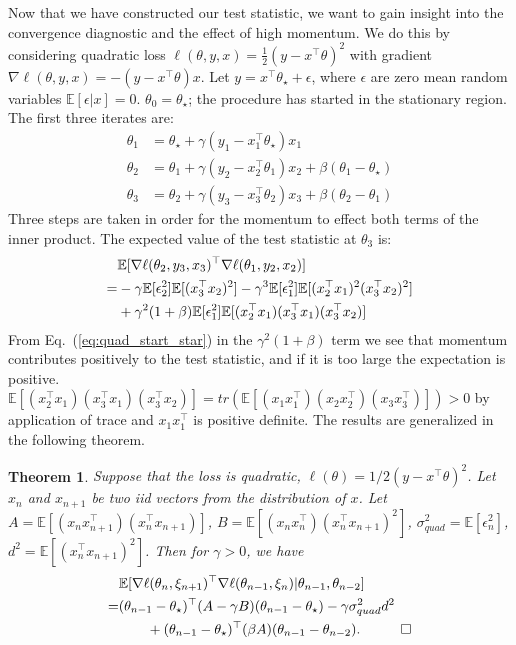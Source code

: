 \documentclass[conference]{IEEEtran}
\newcommand{\Ex}[1]{\mathbb{E}[ #1 ]}
\newtheorem{theorem}{Theorem}
\begin{document}
Now that we have constructed our test statistic, we want to gain insight into the convergence diagnostic and the effect of high momentum.
We do this by considering quadratic loss $\ell ( \theta, y, x ) = \frac{1}{2} ( y - x^\top \theta )^2$ with gradient $\nabla \ell ( \theta, y, x ) = - ( y - x^\top \theta) x$.
Let $y = x^\top \theta_\star + \epsilon$, where $\epsilon$ are zero mean random variables $\Ex{ \epsilon | x } = 0$. $\theta_0 = \theta_\star$; the procedure has started in the stationary region.
The first three iterates are:
\begin{align*}
\theta_1 &= \theta_\star + \gamma ( y_1 - x_1^\top \theta_\star ) x_1 \\
\theta_2 &= \theta_1 + \gamma ( y_2 - x_2^\top \theta_1 ) x_2 + \beta ( \theta_1 - \theta_\star ) \\
\theta_3 &= \theta_2 + \gamma ( y_3 - x_3^\top \theta_2 ) x_3 + \beta ( \theta_2 - \theta_1 )
\end{align*}
Three steps are taken in order for the momentum to effect both terms of the inner product.
The expected value of the test statistic at $\theta_3$ is:
\begin{align}\notag
&\Ex{ \nabla \ell ( \theta_2, y_3, x_3 )^\top \nabla \ell ( \theta_1, y_2, x_2 ) }  \\
=& - \gamma \Ex{ \epsilon_2^2 } \Ex{ ( x_3^\top x_2 )^2 } - \gamma^3 \Ex { \epsilon_1^2 } \Ex { ( x_2^\top x_1 )^2 ( x_3^\top x_2 )^2 } \nonumber \\\label{eq:quad_start_star}
& + \gamma^2 ( 1 + \beta ) \Ex{ \epsilon_1^2 } \Ex{ ( x_2^\top x_1 ) ( x_3^\top x_1 ) ( x_3^\top x_2 ) } 
\end{align}
From Eq.~(\ref{eq:quad_start_star}) in the $\gamma^2 (1+\beta)$ term we see that momentum contributes positively to the test statistic, and if it is too large the expectation is positive.  $\Ex{ ( x_2^\top x_1 ) ( x_3^\top x_1 ) ( x_3^\top x_2 ) } = tr( \Ex{(x_1 x_1^\top) (x_2 x_2^\top) (x_3 x_3^\top) } ) > 0$ by application of trace and $x_1 x_1^\top$ is positive definite.
The results are generalized in the following theorem. 
\begin{theorem}
\label{thm:quad_diag}
Suppose that the loss is quadratic, $\ell ( \theta ) = 1/2 ( y - x^\top \theta )^2$. 
Let $x_n$ and $x_{n+1}$ be two iid vectors from the distribution of $x$.
Let $A = \Ex{ ( x_n x_{n+1}^\top ) ( x_n^\top x_{n+1} ) }$, $B = \Ex{ ( x_{n} x_n^\top ) ( x_n^\top x_{n+1} )^2 }$, $\sigma_{quad}^2 = \Ex { \epsilon_n^2 }$, $d^2 = \Ex{ ( x_n^\top x_{n+1} )^2 }$.
Then for $\gamma > 0$, we have
\begin{align}\notag
&\Ex{ \nabla \ell ( \theta_n, \xi_{n+1} )^\top \nabla \ell ( \theta_{n-1}, \xi_n ) |  \theta_{n-1}, \theta_{n-2} } \\\notag
=& ( \theta_{n-1} - \theta_\star )^\top ( A - \gamma B) ( \theta_{n-1} - \theta_\star )
- \gamma \sigma_{quad}^2 d^2 \\\notag
&\quad\quad + ( \theta_{n-1} - \theta_\star )^\top ( \beta A ) ( \theta_{n-1} - \theta_{n-2} ).\hspace{0.4in} \Box
\end{align}
\end{theorem}
\end{document}
